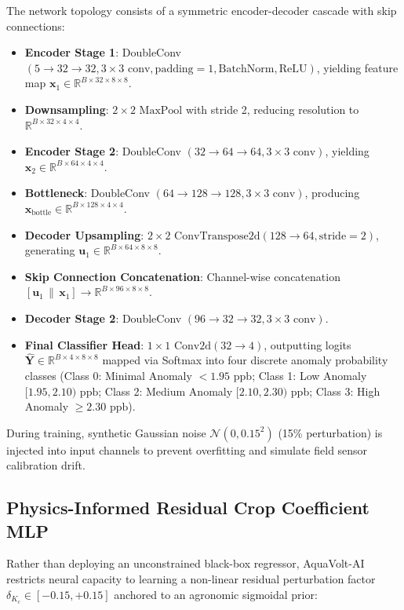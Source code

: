\documentclass[sn-mathphys-num,Numbered]{sn-jnl}
\begin{document}
The network topology consists of a symmetric encoder-decoder cascade with skip connections:
\begin{itemize}
    \item \textbf{Encoder Stage 1}: DoubleConv $(5 \to 32 \to 32, 3 \times 3\text{ conv}, \text{padding}=1, \text{BatchNorm}, \text{ReLU})$, yielding feature map $\mathbf{x}_1 \in \mathbb{R}^{B \times 32 \times 8 \times 8}$.
    \item \textbf{Downsampling}: $2 \times 2\text{ MaxPool}$ with stride 2, reducing resolution to $\mathbb{R}^{B \times 32 \times 4 \times 4}$.
    \item \textbf{Encoder Stage 2}: DoubleConv $(32 \to 64 \to 64, 3 \times 3\text{ conv})$, yielding $\mathbf{x}_2 \in \mathbb{R}^{B \times 64 \times 4 \times 4}$.
    \item \textbf{Bottleneck}: DoubleConv $(64 \to 128 \to 128, 3 \times 3\text{ conv})$, producing $\mathbf{x}_{\text{bottle}} \in \mathbb{R}^{B \times 128 \times 4 \times 4}$.
    \item \textbf{Decoder Upsampling}: $2 \times 2\text{ ConvTranspose2d} (128 \to 64, \text{stride}=2)$, generating $\mathbf{u}_1 \in \mathbb{R}^{B \times 64 \times 8 \times 8}$.
    \item \textbf{Skip Connection Concatenation}: Channel-wise concatenation $[\mathbf{u}_1 \,\|\, \mathbf{x}_1] \to \mathbb{R}^{B \times 96 \times 8 \times 8}$.
    \item \textbf{Decoder Stage 2}: DoubleConv $(96 \to 32 \to 32, 3 \times 3\text{ conv})$.
    \item \textbf{Final Classifier Head}: $1 \times 1\text{ Conv2d} (32 \to 4)$, outputting logits $\hat{\mathbf{Y}} \in \mathbb{R}^{B \times 4 \times 8 \times 8}$ mapped via Softmax into four discrete anomaly probability classes (Class 0: Minimal Anomaly $<1.95\text{ ppb}$; Class 1: Low Anomaly $[1.95, 2.10)\text{ ppb}$; Class 2: Medium Anomaly $[2.10, 2.30)\text{ ppb}$; Class 3: High Anomaly $\ge 2.30\text{ ppb}$).
\end{itemize}

During training, synthetic Gaussian noise $\mathcal{N}(0, 0.15^2)$ (15\% perturbation) is injected into input channels to prevent overfitting and simulate field sensor calibration drift.

\subsection{Physics-Informed Residual Crop Coefficient MLP}\label{sec:methods_piml_mlp}
Rather than deploying an unconstrained black-box regressor, AquaVolt-AI restricts neural capacity to learning a non-linear residual perturbation factor $\delta_{K_c} \in [-0.15, +0.15]$ anchored to an agronomic sigmoidal prior:
\end{document}
